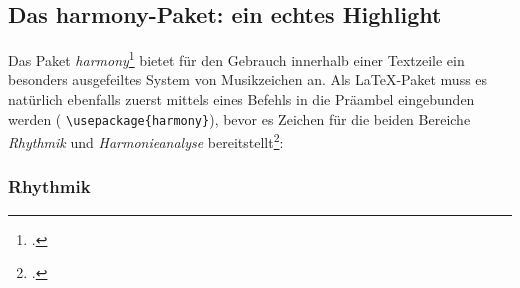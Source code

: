 %
%
%




\subsection{Das harmony-Paket: ein echtes Highlight}

Das Paket \textit{harmony}\footcite[vgl.][\nopage wp]{CtanHarmony2018a} bietet für
den Gebrauch innerhalb einer Textzeile ein besonders ausgefeiltes System von
Musikzeichen an. Als \LaTeX-Paket muss es natürlich ebenfalls zuerst mittels
eines Befehls in die Präambel eingebunden werden (\small 
\texttt{\textbackslash{usepackage\{harmony\}}}), bevor es Zeichen für die beiden
Bereiche \textit{Rhythmik} und \textit{Harmonieanalyse} bereitstellt\footcite[Für
einen vollen Überblick über den Zeichenvorrat und die Kombinationsmöglichkeiten
vgl.][4ff]{WegWeg2007a}:

\subsubsection{\small Rhythmik}

